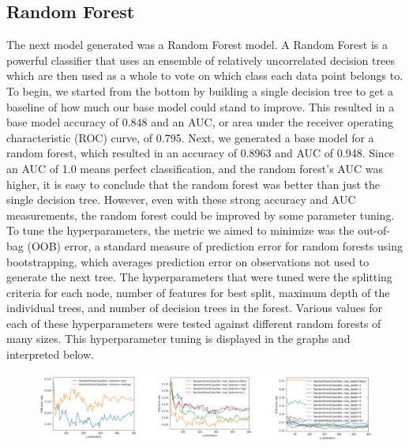 \documentclass{article}
\begin{document}
\subsection{Random Forest}
The next model generated was a Random Forest model. A Random Forest is a powerful classifier that uses an ensemble of relatively uncorrelated decision trees which are then used as a whole to vote on which class each data point belongs to. To begin, we started from the bottom by building a single decision tree to get a baseline of how much our base model could stand to improve. This resulted in a base model accuracy of 0.848 and an AUC, or area under the receiver operating characteristic (ROC) curve, of 0.795. Next, we generated a base model for a random forest, which resulted in an accuracy of 0.8963 and AUC of 0.948. Since an AUC of 1.0 means perfect classification, and the random forest’s AUC was higher, it is easy to conclude that the random forest was better than just the single decision tree. However, even with these strong accuracy and AUC measurements, the random forest could be improved by some parameter tuning. To tune the hyperparameters, the metric we aimed to minimize was the out-of-bag (OOB) error, a standard measure of prediction error for random forests using bootstrapping, which averages prediction error on observations not used to generate the next tree. The hyperparameters that were tuned were the splitting criteria for each node, number of features for best split, maximum depth of the individual trees, and number of decision trees in the forest. Various values for each of these hyperparameters were tested against different random forests of many sizes. This hyperparameter tuning is displayed in the graphs and interpreted below.

\begin{figure}[htp]
    \centering
    \includegraphics[width=12cm]{RF_hyperparameter_tuning.png}
    \label{fig:randforest}
\end{figure}
\end{document}

